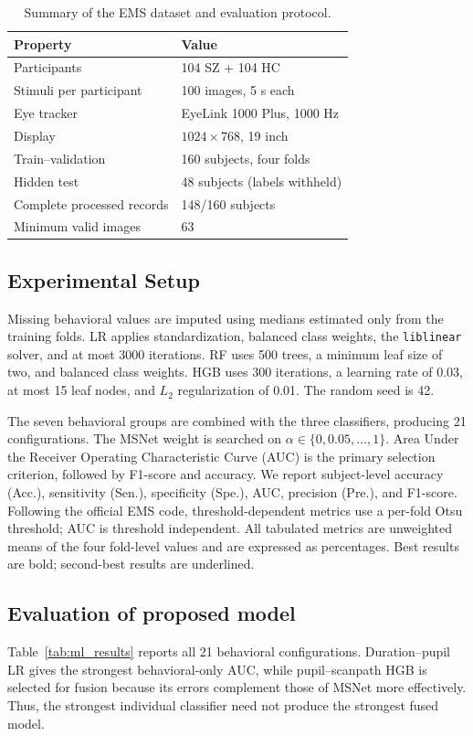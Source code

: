 \documentclass[conference,a4paper]{IEEEtran}
\begin{document}
\begin{table}[t]
\caption{Summary of the EMS dataset and evaluation protocol.}
\label{tab:dataset}
\centering
\small
\begin{tabular}{@{}ll@{}}
\toprule
Property & Value \\
\midrule
Participants & 104 SZ + 104 HC \\
Stimuli per participant & 100 images, 5 s each \\
Eye tracker & EyeLink 1000 Plus, 1000 Hz \\
Display & $1024\times768$, 19 inch \\
Train--validation & 160 subjects, four folds \\
Hidden test & 48 subjects (labels withheld) \\
Complete processed records & 148/160 subjects \\
Minimum valid images & 63 \\
\bottomrule
\end{tabular}
\end{table}

\subsection{Experimental Setup}
Missing behavioral values are imputed using medians estimated only from the training folds. LR applies standardization, balanced class weights, the \texttt{liblinear} solver, and at most 3000 iterations. RF uses 500 trees, a minimum leaf size of two, and balanced class weights. HGB uses 300 iterations, a learning rate of 0.03, at most 15 leaf nodes, and $L_2$ regularization of 0.01. The random seed is 42.

The seven behavioral groups are combined with the three classifiers, producing 21 configurations. The MSNet weight is searched on $\alpha\in\{0,0.05,\ldots,1\}$. Area Under the Receiver Operating Characteristic Curve (AUC) is the primary selection criterion, followed by F1-score and accuracy. We report subject-level accuracy (Acc.), sensitivity (Sen.), specificity (Spe.), AUC, precision (Pre.), and F1-score. Following the official EMS code, threshold-dependent metrics use a per-fold Otsu threshold; AUC is threshold independent. All tabulated metrics are unweighted means of the four fold-level values and are expressed as percentages. Best results are bold; second-best results are underlined.

\subsection{Evaluation of proposed model}
Table~\ref{tab:ml_results} reports all 21 behavioral configurations. Duration--pupil LR gives the strongest behavioral-only AUC, while pupil--scanpath HGB is selected for fusion because its errors complement those of MSNet more effectively. Thus, the strongest individual classifier need not produce the strongest fused model.
\end{document}
